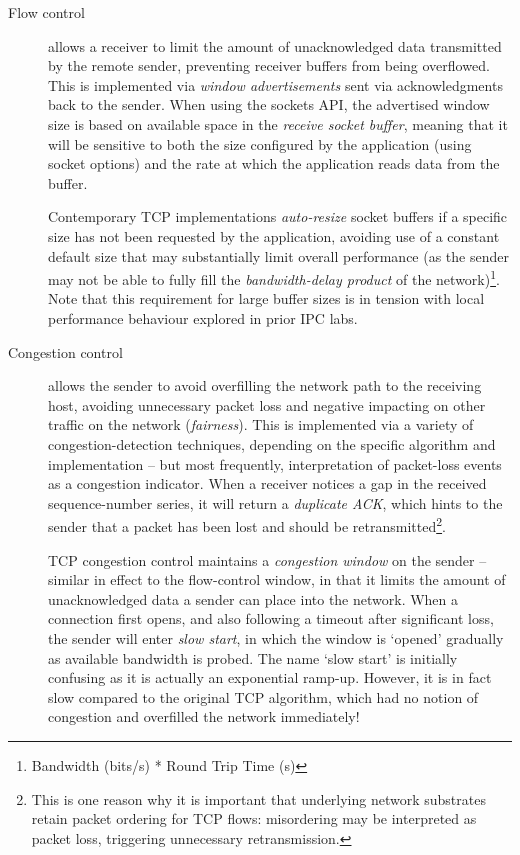\documentclass[a4paper,10pt]{article}
\begin{document}
\begin{description}
\item[Flow control] allows a receiver to limit the amount of unacknowledged
  data transmitted by the remote sender, preventing receiver buffers from
  being overflowed.
  This is implemented via \textit{window advertisements} sent via
  acknowledgments back to the sender.
  When using the sockets API, the advertised window size is based on available
  space in the \textit{receive socket buffer}, meaning that it will be
  sensitive to both the size configured by the application (using socket
  options) and the rate at which the application reads data from the buffer.

  Contemporary TCP implementations \textit{auto-resize} socket buffers if a
  specific size has not been requested by the application, avoiding use of a
  constant default size that may substantially limit overall performance (as
  the sender may not be able to fully fill the \textit{bandwidth-delay
  product} of the network)\footnote{Bandwidth (bits/s) * Round Trip Time (s)}.
  Note that this requirement for large buffer sizes is in tension with local
  performance behaviour explored in prior IPC labs.

\item[Congestion control] allows the sender to avoid overfilling the network
  path to the receiving host, avoiding unnecessary packet loss and negative
  impacting on other traffic on the network (\textit{fairness}).
  This is implemented via a variety of congestion-detection techniques,
  depending on the specific algorithm and implementation -- but most
  frequently, interpretation of packet-loss events as a congestion indicator.
  When a receiver notices a gap in the received sequence-number series, it
  will return a \textit{duplicate ACK}, which hints to the sender that a
  packet has been lost and should be retransmitted\footnote{This is one reason
  why it is important that underlying network substrates retain packet
  ordering for TCP flows: misordering may be interpreted as packet loss,
  triggering unnecessary retransmission.}.

  TCP congestion control maintains a \textit{congestion window} on the sender
  -- similar in effect to the flow-control window, in that it limits the
  amount of unacknowledged data a sender can place into the network.
  When a connection first opens, and also following a timeout after
  significant loss, the sender will enter \textit{slow start}, in which the
  window is `opened' gradually as available bandwidth is probed.
  The name `slow start' is initially confusing as it is actually an
  exponential ramp-up.
  However, it is in fact slow compared to the original TCP algorithm, which
  had no notion of congestion and overfilled the network immediately!


\end{description}
\end{document}
